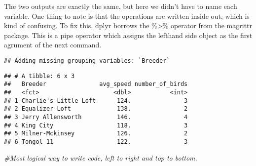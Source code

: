 \documentclass[]{article}
\newenvironment{Shaded}{\begin{snugshade}}{\end{snugshade}}
\newcommand{\KeywordTok}[1]{\textcolor[rgb]{0.13,0.29,0.53}{\textbf{#1}}}
\newcommand{\DataTypeTok}[1]{\textcolor[rgb]{0.13,0.29,0.53}{#1}}
\newcommand{\DecValTok}[1]{\textcolor[rgb]{0.00,0.00,0.81}{#1}}
\newcommand{\StringTok}[1]{\textcolor[rgb]{0.31,0.60,0.02}{#1}}
\newcommand{\CommentTok}[1]{\textcolor[rgb]{0.56,0.35,0.01}{\textit{#1}}}
\newcommand{\OtherTok}[1]{\textcolor[rgb]{0.56,0.35,0.01}{#1}}
\newcommand{\OperatorTok}[1]{\textcolor[rgb]{0.81,0.36,0.00}{\textbf{#1}}}
\newcommand{\NormalTok}[1]{#1}
\begin{document}
The two outputs are exactly the same, but here we didn't have to name
each variable. One thing to note is that the operations are written
inside out, which is kind of confusing. To fix this, dplyr borrows the
\%\textgreater{}\% operator from the magrittr package. This is a pipe
operator which assigns the lefthand side object as the first agrument of
the next command.

\begin{Shaded}
\end{Shaded}

\begin{verbatim}
## Adding missing grouping variables: `Breeder`
\end{verbatim}

\begin{verbatim}
## # A tibble: 6 x 3
##   Breeder               avg_speed number_of_birds
##   <fct>                     <dbl>           <int>
## 1 Charlie's Little Loft      124.               3
## 2 Equalizer Loft             138.               2
## 3 Jerry Allensworth          146.               4
## 4 King City                  118.               3
## 5 Milner-Mckinsey            126.               2
## 6 Tongol 11                  122.               3
\end{verbatim}

\begin{Shaded}
\begin{Highlighting}[]
\CommentTok{#Most logical way to write code, left to right and top to bottom.}
\end{Highlighting}
\end{Shaded}
\end{document}
